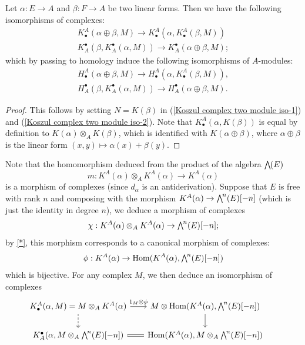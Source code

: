 \begin{corollary}\label{Koszul complex two linear form iso}
Let $\alpha:E\to A$ and $\beta:F\to A$ be two linear forms. Then we have the following isomorphisms of complexes:
\begin{align}
K_\bullet^A(\alpha\oplus\beta,M)\to K_\bullet^A(\alpha,K_\bullet^A(\beta,M))\label{Koszul complex two module iso-3}\\
K^\bullet_A(\beta,K^\bullet_A(\alpha,M))\to K^\bullet_A(\alpha\oplus\beta,M);\label{Koszul complex two module iso-4}
\end{align}
which by passing to homology induce the following isomorphisms of $A$-modules:
\begin{align}
H^A_\bullet(\alpha\oplus\beta,M)\to H_\bullet^A(\alpha,K_\bullet^A(\beta,M)),\label{Koszul complex two module homology-1}\\
H^\bullet_A(\beta,K^\bullet_A(\alpha,M))\to H^\bullet_A(\alpha\oplus\beta,M).\label{Koszul complex two module homology-2}
\end{align}
\end{corollary}
\begin{proof}
This follows by setting $N=K(\beta)$ in (\ref{Koszul complex two module iso-1}) and (\ref{Koszul complex two module iso-2}). Note that $K_\bullet^A(\alpha,K(\beta))$ is equal by definition to $K(\alpha)\otimes_AK(\beta)$, which is identified with $K(\alpha\oplus\beta)$, where $\alpha\oplus\beta$ is the linear form $(x,y)\mapsto\alpha(x)+\beta(y)$. 
\end{proof}
Note that the homomorphism deduced from the product of the algebra $\bigw(E)$
\[m:K^A(\alpha)\otimes_AK^A(\alpha)\to K^A(\alpha)\]
is a morphism of complexes (since $d_\alpha$ is an antiderivation). Suppose that $E$ is free with rank $n$ and composing with the morphism $K^A(\alpha)\to\bigw^n(E)[-n]$ (which is just the identity in degree $n$), we deduce a morphism of complexes
\[\chi:K^A(\alpha)\otimes_AK^A(\alpha)\to\bigw^n(E)[-n];\]
by \cref{*}, this morphism corresponds to a canonical morphism of complexes:
\[\phi:K^A(\alpha)\to\Hom(K^A(\alpha),\bigw^n(E)[-n])\]
which is bijective. For any complex $M$, we then deduce an isomorphism of complexes
\[\begin{tikzcd}[column sep=6mm,row sep=6mm]
K_\bullet^A(\alpha,M)=M\otimes_AK^A(\alpha)\ar[d,dashed]\ar[r,"1_M\otimes\phi"]&M\otimes\Hom(K^A(\alpha),\bigw^n(E)[-n])\ar[d]&\\
K_A^\bullet(\alpha,M\otimes_A\bigw^n(E)[-n])\ar[r,equal]&\Hom(K^A(\alpha),M\otimes_A\bigw^n(E)[-n])
\end{tikzcd}\]
